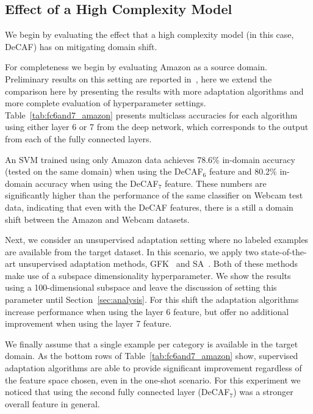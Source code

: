 


\subsection{Effect of a High Complexity Model}


We begin by evaluating the effect that a high complexity model (in this case,
DeCAF) has on mitigating domain shift.

For completeness we begin by evaluating Amazon as a source domain. 
Preliminary results on this setting are reported in~\cite{deeplearning-arxiv-2013}, here 
we extend the comparison here by
presenting the results with more adaptation algorithms and more complete
evaluation of hyperparameter settings. Table~\ref{tab:fc6and7_amazon} presents %
multiclass accuracies for each algorithm using either layer 6 or 7 from the deep
network, which corresponds to the output from each of the fully connected layers.

An SVM trained using only Amazon data achieves 78.6\% in-domain accuracy (tested on the same domain) when using the DeCAF$_6$ feature and 80.2\% in-domain accuracy when using the DeCAF$_7$ feature. These numbers are significantly higher than the performance of the same classifier on Webcam test data, indicating that even with the DeCAF features, there is a still a domain shift between the Amazon and Webcam datasets. 

Next, we consider an unsupervised adaptation setting where no labeled examples are available from the target dataset. In this scenario, we apply two state-of-the-art unsupervised adaptation methods, GFK~\cite{gong-cvpr12} and SA~\cite{sa}. 
Both of these methods make use of a subspace dimensionality hyperparameter.
We show the results using a 100-dimensional subspace and leave the discussion of setting this parameter until Section~\ref{sec:analysis}. For this shift the adaptation algorithms increase performance when using the layer 6 feature, but offer no additional improvement when using the layer 7 feature. 

We finally assume that a single example per category is available in the target domain.
As the bottom rows of Table~\ref{tab:fc6and7_amazon} show, supervised adaptation algorithms are able to provide significant improvement regardless of the feature space chosen, even in the one-shot scenario. %
For this experiment we noticed that using the second fully connected layer (DeCAF$_7$) was a stronger overall feature in general.

